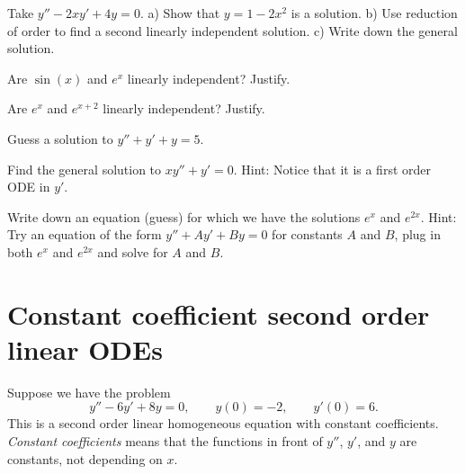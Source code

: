 \documentclass[12pt]{book}
\begin{document}
\begin{exercise}
Take 
$y''-2xy' + 4y = 0$.  a) Show that $y=1-2x^2$ is a solution.  
b) Use reduction of order to find a second linearly independent solution.
c) Write down the general solution.
\end{exercise}

\setcounter{exercise}{100}

\begin{exercise}
Are $\sin(x)$ and $e^x$ linearly independent?  Justify.
\end{exercise}

\begin{exercise}
Are $e^x$ and $e^{x+2}$ linearly independent?  Justify.
\end{exercise}

\begin{exercise}
Guess a solution to $y'' + y' + y= 5$.
\end{exercise}

\begin{exercise}
Find the general solution to
$x y'' + y' = 0$.  Hint: Notice that it is a first order ODE in $y'$.
\end{exercise}

\begin{exercise}
Write down an equation (guess) for which we have the solutions
$e^x$ and $e^{2x}$.  Hint: Try an equation of the form
$y''+Ay'+By = 0$ for constants $A$ and $B$,
plug in both $e^x$ and $e^{2x}$ and solve for $A$ and $B$.
\end{exercise}



\sectionnewpage
\section{Constant coefficient second order linear ODEs}
\label{sec:ccsol}


Suppose we have the problem
\begin{equation*}
y''-6y'+8y = 0, \qquad y(0) = - 2, \qquad y'(0) = 6 .
\end{equation*}
This is a second order linear homogeneous equation with constant
coefficients.  \emph{Constant coefficients}
means that the functions 
in front of $y''$, $y'$, and $y$ are constants, not depending on $x$.
\end{document}
